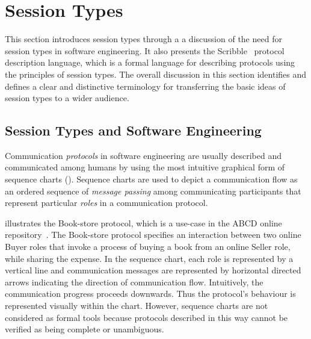 
\section{Session Types}
\label{sec:session_types}


This section introduces session types through a
a discussion of the need for session types in
software engineering.
It also presents the Scribble~\cite{scribble} protocol
description language, which is a formal language for describing
protocols using the principles of session types.
The overall discussion in this section identifies and defines
a clear and distinctive terminology 
for transferring the basic ideas of session
types to a wider audience.

\subsection{Session Types and Software Engineering}%
\label{sec:sessions_software}



Communication \emph{protocols} in software engineering
are usually described and communicated among humans
by using the most intuitive graphical form of sequence charts 
().
Sequence charts are used to depict a communication flow as an ordered
sequence of \emph{message passing} among communicating
participants that represent particular \emph{roles} in a communication
protocol.

 illustrates the Book-store protocol, which is a use-case
in the ABCD online repository~\cite{usecase_repository}.
The Book-store protocol specifies an interaction between two online Buyer roles
that invoke a process of buying a book from an online Seller role, while
sharing the expense.
In the sequence chart, each role is represented by a vertical line and
communication messages are represented by horizontal directed arrows
indicating the direction of communication flow.
Intuitively, the communication progress proceeds downwards.
Thus the protocol's behaviour is represented visually within the chart.
However, sequence charts are not considered as formal tools because
protocols described in this way cannot be verified as being complete or unambiguous.


